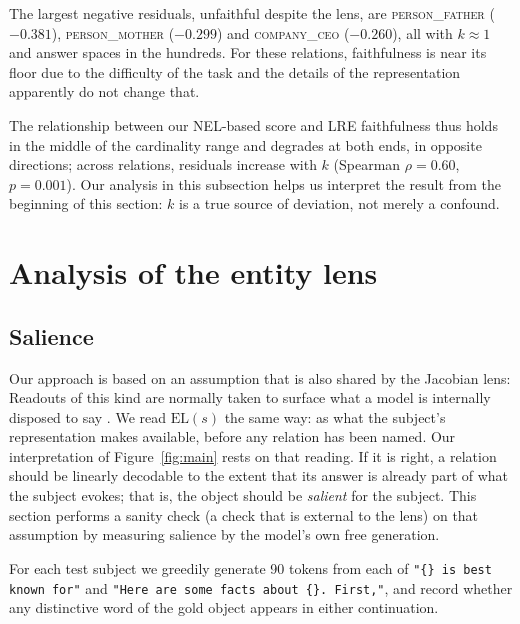 \documentclass{article}
\begin{document}
The largest negative residuals, unfaithful despite the
lens, are \textsc{person\_father} ($-0.381$),
\textsc{person\_mother} ($-0.299$) and \textsc{company\_ceo}
($-0.260$), all with $k \approx 1$ and answer spaces in the
hundreds. For these relations, faithfulness is near its
floor due to the difficulty of the task and the details of
the representation apparently do not change that.

The relationship between our NEL-based score and LRE
faithfulness thus holds in the middle of the cardinality
range and degrades at both ends, in opposite directions;
across relations, residuals increase with $k$ (Spearman
$\rho = 0.60$, $p = 0.001$).
Our analysis in this subsection helps us interpret the
result from the beginning of this section: $k$ is a true
source of deviation, not merely a confound.







\section{Analysis of the entity lens}
\subsection{Salience}
\label{sec:salience}
Our approach is based on an assumption that is also shared
by the Jacobian lens:
Readouts of this kind
are normally taken to surface what a
model is internally disposed to say
\citep{gurnee2026workspace}. We read $\mbox{EL}(s)$ the same way: as what the subject's representation makes
available, before any relation has been named. Our interpretation of
Figure~\ref{fig:main} rests on that reading. If it is right, a relation
should be linearly decodable to the extent that its answer is already
part of what the subject evokes; that is, the object should be
\emph{salient} for the subject.
This section performs a sanity check
(a check that is external to the lens)
on that assumption by
measuring salience by the
model's own free generation.

For each test subject we greedily generate 90 tokens
from each of \texttt{"\{\} is best known for"} and \texttt{"Here are some
facts about \{\}. First,"}, and record whether any distinctive word of the
gold object appears in either continuation.
\end{document}
